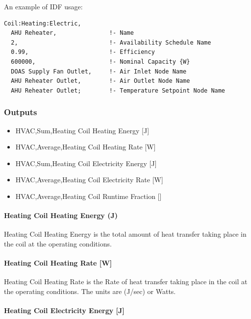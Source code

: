 An example of IDF usage:

\begin{lstlisting}
Coil:Heating:Electric,
  AHU Reheater,               !- Name
  2,                          !- Availability Schedule Name
  0.99,                       !- Efficiency
  600000,                     !- Nominal Capacity {W}
  DOAS Supply Fan Outlet,     !- Air Inlet Node Name
  AHU Reheater Outlet,        !- Air Outlet Node Name
  AHU Reheater Outlet;        !- Temperature Setpoint Node Name
\end{lstlisting}

\subsubsection{Outputs}\label{outputs-2-011}

\begin{itemize}
\item
  HVAC,Sum,Heating Coil Heating Energy {[}J{]}
\item
  HVAC,Average,Heating Coil Heating Rate {[}W{]}
\item
  HVAC,Sum,Heating Coil Electricity Energy {[}J{]}
\item
  HVAC,Average,Heating Coil Electricity Rate {[}W{]}
\item
  HVAC,Average,Heating Coil Runtime Fraction {[]}
\end{itemize}

\paragraph{Heating Coil Heating Energy (J)}\label{heating-coil-heating-energy-j-2}

Heating Coil Heating Energy is the total amount of heat transfer taking place in the coil at the operating conditions.

\paragraph{Heating Coil Heating Rate {[}W{]}}\label{heating-coil-heating-rate-w-2}

Heating Coil Heating Rate is the Rate of heat transfer taking place in the coil at the operating conditions. The units are (J/sec) or Watts.

\paragraph{Heating Coil Electricity Energy {[}J{]}}\label{heating-coil-electric-energy-j}

